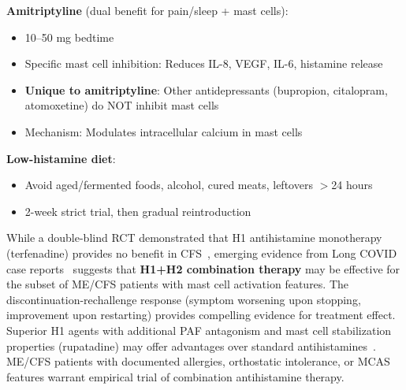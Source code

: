 \textbf{Amitriptyline} (dual benefit for pain/sleep + mast cells):
\begin{itemize}
    \item 10--50 mg bedtime
    \item Specific mast cell inhibition: Reduces IL-8, VEGF, IL-6, histamine release~\cite{Clemons2011}
    \item \textbf{Unique to amitriptyline}: Other antidepressants (bupropion, citalopram, atomoxetine) do NOT inhibit mast cells~\cite{Clemons2011}
    \item Mechanism: Modulates intracellular calcium in mast cells
\end{itemize}

\textbf{Low-histamine diet}:
\begin{itemize}
    \item Avoid aged/fermented foods, alcohol, cured meats, leftovers $>$24 hours
    \item 2-week strict trial, then gradual reintroduction
\end{itemize}

\begin{achievement}
\label{ach:h1h2-combination}
While a double-blind RCT demonstrated that H1 antihistamine monotherapy (terfenadine) provides no benefit in CFS~\cite{Steinberg1996}, emerging evidence from Long COVID case reports~\cite{Davis2023} suggests that \textbf{H1+H2 combination therapy} may be effective for the subset of ME/CFS patients with mast cell activation features. The discontinuation-rechallenge response (symptom worsening upon stopping, improvement upon restarting) provides compelling evidence for treatment effect. Superior H1 agents with additional PAF antagonism and mast cell stabilization properties (rupatadine) may offer advantages over standard antihistamines~\cite{Pinero-Gonzalez2024,Mullol2008}. ME/CFS patients with documented allergies, orthostatic intolerance, or MCAS features warrant empirical trial of combination antihistamine therapy.
\end{achievement}

